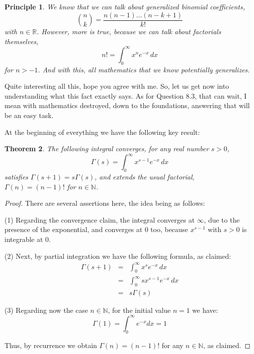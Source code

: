 \documentclass[12pt]{amsbook}
\newtheorem{theorem}{Theorem}[chapter]
\newtheorem{principle}[theorem]{Principle}
\begin{document}
\begin{principle}
We know that we can talk about generalized binomial coefficients,
$$\binom{n}{k}=\frac{n(n-1)\ldots(n-k+1)}{k!}$$
with $n\in\mathbb R$. However, more is true, because we can talk about factorials themselves,
$$n!=\int_0^\infty x^ne^{-x}\,dx$$
for $n>-1$. And with this, all mathematics that we know potentially generalizes.
\end{principle}

Quite interesting all this, hope you agree with me. So, let us get now into understanding what this fact exactly says. As for Question 8.3, that can wait, I mean with mathematics destroyed, down to the foundations, answering that will be an easy task.

\bigskip

At the beginning of everything we have the following key result:


\begin{theorem}
The following integral converges, for any real number $s>0$,
$$\Gamma(s)=\int_0^\infty x^{s-1}e^{-x}\,dx$$
satisfies $\Gamma(s+1)=s\Gamma(s)$, and extends the usual factorial, $\Gamma(n)=(n-1)!$ for $n\in\mathbb N$.
\end{theorem}

\begin{proof}
There are several assertions here, the idea being as follows:

\medskip

(1) Regarding the convergence claim, the integral converges at $\infty$, due to the presence of the exponential, and converges at $0$ too, because $x^{s-1}$ with $s>0$ is integrable at $0$.

\medskip

(2) Next, by partial integration we have the following formula, as claimed:
\begin{eqnarray*}
\Gamma(s+1)
&=&\int_0^\infty x^se^{-x}\,dx\\
&=&\int_0^\infty sx^{s-1}e^{-x}\,dx\\
&=&s\Gamma(s)
\end{eqnarray*}

(3) Regarding now the case $n\in\mathbb N$, for the initial value $n=1$ we have:
$$\Gamma(1)=\int_0^\infty e^{-x}dx=1$$

Thus, by recurrence we obtain $\Gamma(n)=(n-1)!$ for any $n\in\mathbb N$, as claimed.
\end{proof}
\end{document}
